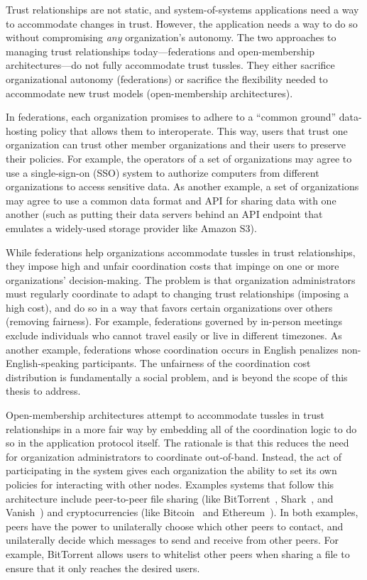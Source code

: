 Trust relationships are not static, and system-of-systems applications need a
way to accommodate changes in trust.  However, the application needs a way to do
so without compromising \emph{any} organization's autonomy.  
The two approaches to managing trust relationships today---federations and open-membership
architectures---do not fully accommodate trust tussles.  They 
either sacrifice organizational autonomy (federations) or sacrifice 
the flexibility needed to accommodate new trust models (open-membership
architectures).

In federations, each organization promises to adhere to a
``common ground'' data-hosting policy that allows them to interoperate.
This way, users that trust one organization can trust other member organizations
and their users to preserve their policies.
For example, the operators of a set of organizations may agree to use a
single-sign-on (SSO) system to authorize computers from different organizations
to access sensitive data.  As another example, a set of organizations may agree
to use a common data format and API for sharing data with one another (such as
putting their data servers behind an API endpoint that emulates a widely-used
storage provider like Amazon S3).

While federations help organizations accommodate
tussles in trust relationships, they impose high and unfair coordination costs
that impinge on one or more organizations' decision-making.  The problem is 
that organization administrators must regularly coordinate to adapt
to changing trust relationships (imposing a high cost), and do so in a way that
favors certain organizations over others (removing fairness).  For example,
federations governed by in-person meetings exclude individuals who cannot
travel easily or live in different timezones.
As another example, federations whose coordination occurs in English
penalizes non-English-speaking participants.  The unfairness of the
coordination cost distribution is fundamentally a social problem, and is beyond
the scope of this thesis to address.

Open-membership architectures attempt to accommodate tussles in trust
relationships in a more fair way by embedding all of the coordination logic to do so in the
application protocol itself.  The rationale is
that this reduces the need for organization administrators to coordinate
out-of-band.  Instead, the act of participating in the system gives
each organization the ability to set its own policies for interacting with other
nodes.  Examples systems that follow this architecture include peer-to-peer file sharing
(like BitTorrent~\cite{bittorrent}, Shark~\cite{shark}, and Vanish~\cite{vanish})
and cryptocurrencies (like Bitcoin~\cite{bitcoin} and Ethereum~\cite{ethereum}).
In both examples, peers have the power to unilaterally choose which other peers to contact, and
unilaterally decide which messages to send and receive from other peers.  For
example, BitTorrent allows users to whitelist other peers when sharing a file to
ensure that it only reaches the desired users.

